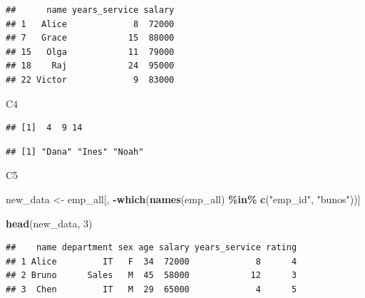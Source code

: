 \documentclass[
]{article}
\newenvironment{Shaded}{\begin{snugshade}}{\end{snugshade}}
\newcommand{\DecValTok}[1]{\textcolor[rgb]{0.00,0.00,0.81}{#1}}
\newcommand{\FunctionTok}[1]{\textcolor[rgb]{0.13,0.29,0.53}{\textbf{#1}}}
\newcommand{\NormalTok}[1]{#1}
\newcommand{\OtherTok}[1]{\textcolor[rgb]{0.56,0.35,0.01}{#1}}
\newcommand{\SpecialCharTok}[1]{\textcolor[rgb]{0.81,0.36,0.00}{\textbf{#1}}}
\newcommand{\StringTok}[1]{\textcolor[rgb]{0.31,0.60,0.02}{#1}}
\begin{document}
\begin{verbatim}
##      name years_service salary
## 1   Alice             8  72000
## 7   Grace            15  88000
## 15   Olga            11  79000
## 18    Raj            24  95000
## 22 Victor             9  83000
\end{verbatim}

C4

\begin{Shaded}
\end{Shaded}

\begin{verbatim}
## [1]  4  9 14
\end{verbatim}

\begin{Shaded}
\end{Shaded}

\begin{verbatim}
## [1] "Dana" "Ines" "Noah"
\end{verbatim}

C5

\begin{Shaded}
\begin{Highlighting}[]
\NormalTok{new\_data }\OtherTok{\textless{}{-}}\NormalTok{ emp\_all[, }\SpecialCharTok{{-}}\FunctionTok{which}\NormalTok{(}\FunctionTok{names}\NormalTok{(emp\_all) }\SpecialCharTok{\%in\%} \FunctionTok{c}\NormalTok{(}\StringTok{"emp\_id"}\NormalTok{, }\StringTok{"bunos"}\NormalTok{))]}

\FunctionTok{head}\NormalTok{(new\_data, }\DecValTok{3}\NormalTok{)}
\end{Highlighting}
\end{Shaded}

\begin{verbatim}
##    name department sex age salary years_service rating
## 1 Alice         IT   F  34  72000             8      4
## 2 Bruno      Sales   M  45  58000            12      3
## 3  Chen         IT   M  29  65000             4      5
\end{verbatim}
\end{document}

